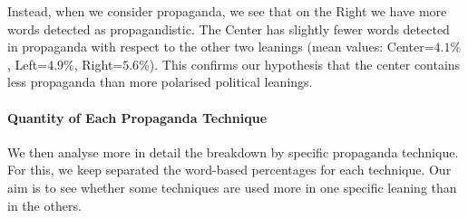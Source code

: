 Instead, when we consider propaganda, we see that on the Right we have more words detected as propagandistic.
The Center has slightly fewer words detected in propaganda with respect to the other two leanings (mean values: Center=$4.1\%$, Left=$4.9\%$, Right=$5.6\%$).
This confirms our hypothesis that the center contains less propaganda than more polarised political leanings.





\paragraph{Quantity of Each Propaganda Technique}
We then analyse more in detail the breakdown by specific propaganda technique. For this, we keep separated the word-based percentages for each technique.
Our aim is to see whether some techniques are used more in one specific leaning than in the others.


